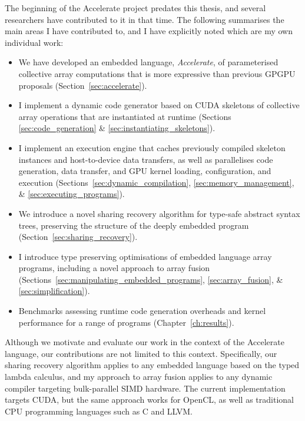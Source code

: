 The beginning of the Accelerate project predates this thesis, and several
researchers have contributed to it in that time. The following summarises the
main areas I have contributed to, and I have explicitly noted which are my own
individual work:
%
\begin{itemize}
    \item We have developed an embedded language, \emph{Accelerate}, of
        parameterised collective array computations that is more expressive than
        previous GPGPU\gpgpu{} proposals (Section~\ref{sec:accelerate}).

    \item I implement a dynamic code generator based on CUDA\cuda{} skeletons of
        collective array operations that are instantiated at runtime
        (Sections \ref{sec:code_generation} \&
        \ref{sec:instantiating_skeletons}).

    \item I implement an execution engine that caches previously compiled
        skeleton instances and host-to-device data transfers, as well as
        parallelises code generation, data transfer, and GPU\gpu{} kernel
        loading, configuration, and execution
        (Sections~\ref{sec:dynamic_compilation},
        \ref{sec:memory_management}, \&
        \ref{sec:executing_programs}).

    \item We introduce a novel sharing recovery algorithm for type-safe abstract
        syntax trees, preserving the structure of the deeply embedded program
        (Section~\ref{sec:sharing_recovery}).

    \item I introduce type preserving optimisations of embedded language array
        programs, including a novel approach to array fusion
        (Sections~\ref{sec:manipulating_embedded_programs},
        \ref{sec:array_fusion}, \&
        \ref{sec:simplification}).

    \item Benchmarks assessing runtime code generation overheads and kernel
        performance for a range of programs (Chapter~\ref{ch:results}).
\end{itemize}

Although we motivate and evaluate our work in the context of the Accelerate
language, our contributions are not limited to this context. Specifically, our
sharing recovery algorithm applies to any embedded language based on the typed
lambda calculus, and my approach to array fusion applies to any dynamic compiler
targeting bulk-parallel SIMD hardware. The current implementation targets
CUDA\cuda{}, but the same approach works for OpenCL, as well as traditional CPU
programming languages such as C and LLVM.

